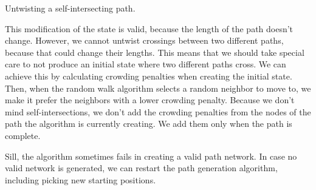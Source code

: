 \begin{center}
    \captionsetup{type=figure}
    \caption{Untwisting a self-intersecting path.}
    \label{fig:untwisting-paths}
\end{center}

This modification of the state is valid, because the length of the path doesn't change.
However, we cannot untwist crossings between two different paths, because that could change their lengths.
This means that we should take special care to not produce an initial state where two different paths cross.
We can achieve this by calculating crowding penalties when creating the initial state.
Then, when the random walk algorithm selects a random neighbor to move to, we make it prefer the neighbors with a lower crowding penalty.
Because we don't mind self-intersections, we don't add the crowding penalties from the nodes of the path the algorithm is currently creating.
We add them only when the path is complete.

Sill, the algorithm sometimes fails in creating a valid path network.
In case no valid network is generated, we can restart the path generation algorithm, including picking new starting positions.

